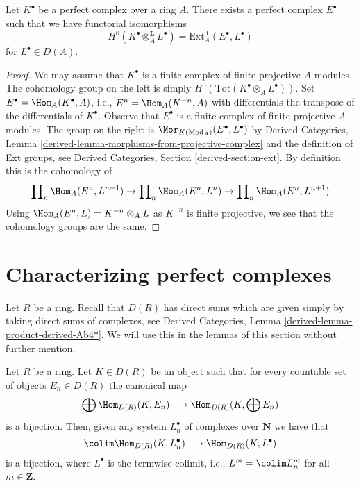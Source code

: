 \begin{lemma}
\label{lemma-dual-perfect-complex}
Let $K^\bullet$ be a perfect complex over a ring $A$. There exists a
perfect complex $E^\bullet$ such that we have functorial isomorphisms
$$
H^0(K^\bullet \otimes_A^\mathbf{L} L^\bullet) =
\text{Ext}_A^0(E^\bullet, L^\bullet)
$$
for $L^\bullet \in D(A)$.
\end{lemma}

\begin{proof}
We may assume that $K^\bullet$ is a finite complex of finite projective
$A$-modules. The cohomology group on the left is simply
$H^0(\text{Tot}(K^\bullet \otimes_A L^\bullet))$. Set
$E^\bullet = \Hom_A(K^\bullet, A)$, i.e., $E^n = \Hom_A(K^{-n}, A)$
with differentials the transpose of the differentials of $K^\bullet$.
Observe that $E^\bullet$ is a finite complex of finite projective $A$-modules.
The group on the right
is $\Mor_{K(\text{Mod}_A)}(E^\bullet, L^\bullet)$ by
Derived Categories, Lemma \ref{derived-lemma-morphisms-from-projective-complex}
and the definition of Ext groups, see
Derived Categories, Section \ref{derived-section-ext}.
By definition this is the cohomology of
$$
\prod\nolimits_n \Hom_A(E^n, L^{n - 1})
\to
\prod\nolimits_n \Hom_A(E^n, L^n)
\to
\prod\nolimits_n \Hom_A(E^n, L^{n + 1})
$$
Using $\Hom_A(E^n, L) = K^{-n} \otimes_A L$ as $K^{-n}$ is finite
projective, we see that the cohomology groups are the same.
\end{proof}





\section{Characterizing perfect complexes}
\label{section-perfect-compact}

\noindent
Let $R$ be a ring. Recall that $D(R)$ has direct sums which are given
simply by taking direct sums of complexes, see
Derived Categories, Lemma \ref{derived-lemma-product-derived-Ab4*}.
We will use this in the lemmas of this section without further mention. 

\begin{lemma}
\label{lemma-commutes-with-countable-sums}
Let $R$ be a ring. Let $K \in D(R)$ be an object such that for every
countable set of objects $E_n \in D(R)$ the canonical map
$$
\bigoplus \Hom_{D(R)}(K, E_n) \longrightarrow \Hom_{D(R)}(K, \bigoplus E_n)
$$
is a bijection. Then, given any system $L_n^\bullet$ of complexes over
$\mathbf{N}$ we have that
$$
\colim \Hom_{D(R)}(K, L^\bullet_n) \longrightarrow \Hom_{D(R)}(K, L^\bullet)
$$
is a bijection, where $L^\bullet$ is the termwise colimit, i.e.,
$L^m = \colim L_n^m$ for all $m \in \mathbf{Z}$.
\end{lemma}

